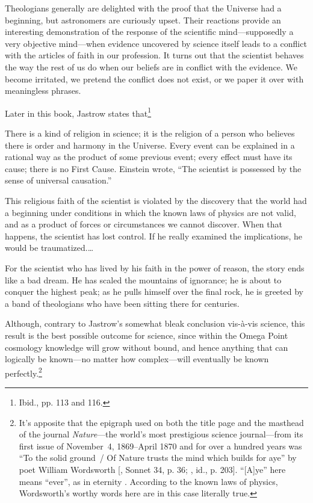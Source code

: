 \documentclass[letterpaper,12pt]{article}
\newenvironment{squote}
  {\small\quote}
  {\endquote\normalsize}
\newenvironment{squotation}
  {\small\quotation}
  {\endquotation\normalsize}
\begin{document}
\begin{squote}
Theologians generally are delighted with the proof that the Universe had a beginning, but astronomers are curiously upset. Their reactions provide an interesting demonstration of the response of the scientific mind---supposedly a
very objective mind---when evidence uncovered by science itself leads to a conflict with the articles of faith in our profession. It turns out that the scientist behaves the way the rest of us do when our beliefs are in conflict with the evidence. We become irritated, we pretend the conflict does not exist, or we paper it over with meaningless phrases.
\end{squote}

Later in this book, Jastrow states that\footnote{Ibid., pp. 113 and 116.}

\begin{squotation}
There is a kind of religion in science; it is the religion of a person who believes there is order and harmony in the Universe. Every event can be explained in a rational way as the product of some previous event; every effect must have its cause; there is no First Cause. Einstein wrote, ``The scientist is possessed by the sense of universal causation.''

This religious faith of the scientist is violated by the discovery that the world had a beginning under conditions in which the known laws of physics are not valid, and as a product of forces or circumstances we cannot discover. When that happens, the scientist has lost control. If he really examined the implications, he would be traumatized.\thinspace\ldots

For the scientist who has lived by his faith in the power of reason, the story ends like a bad dream. He has scaled the mountains of ignorance; he is about to conquer the highest peak; as he pulls himself over the final rock, he is greeted by a band of theologians who have been sitting there for centuries.
\end{squotation}

Although, contrary to Jastrow's somewhat bleak conclusion vis-\`{a}-vis science, this result is the best possible outcome for science, since within the Omega Point cosmology knowledge will grow without bound, and hence anything that can logically be known---no matter how complex---will eventually be known perfectly.\footnote{It's apposite that the epigraph used on both the title page and the masthead of the journal \emph{Nature}---the world's most prestigious science journal---from its first issue of November~4, 1869--April 1870 and for over a hundred years was ``To the solid ground~/ Of Nature trusts the mind which builds for aye'' by poet William Wordsworth [, Sonnet 34, p. 36; , id., p. 203]. ``[A]ye'' here means ``ever'', as in eternity \cite{SimpsonWeiner1989}. According to the known laws of physics, Wordsworth's worthy words here are in this case literally true.}
\end{document}
